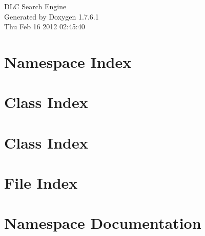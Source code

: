 \documentclass[a4paper]{book}
\begin{document}
\hypersetup{pageanchor=false,citecolor=blue}
\begin{titlepage}
\vspace*{7cm}
\begin{center}
{\Large \-D\-L\-C \-Search \-Engine }\\
\vspace*{1cm}
{\large \-Generated by Doxygen 1.7.6.1}\\
\vspace*{0.5cm}
{\small Thu Feb 16 2012 02:45:40}\\
\end{center}
\end{titlepage}
\clearemptydoublepage
{}
\tableofcontents
\clearemptydoublepage
{}
\hypersetup{pageanchor=true,citecolor=blue}
\chapter{\-Namespace \-Index}

\chapter{\-Class \-Index}

\chapter{\-Class \-Index}

\chapter{\-File \-Index}

\chapter{\-Namespace \-Documentation}








\end{document}
